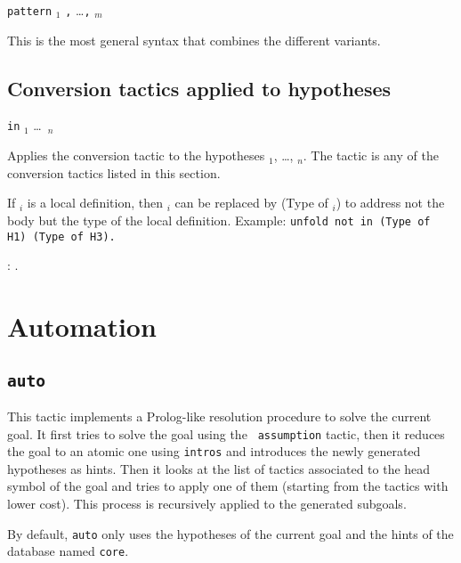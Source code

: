 \begin{coq_example*}
\begin{Variants}
\item {\tt pattern} {\term$_1$}  {\tt ,} \dots {\tt ,}
    {\term$_m$} 

  This is the most general syntax that combines the different variants.

\end{Variants}

\subsection{Conversion tactics applied to hypotheses}

{\convtactic} {\tt in} \ident$_1$ \dots\ \ident$_n$

Applies the conversion tactic {\convtactic} to the
hypotheses \ident$_1$, \ldots, \ident$_n$. The tactic {\convtactic} is
any of the conversion tactics listed in this section.

If \ident$_i$ is a local definition, then \ident$_i$ can be replaced
by (Type of \ident$_i$) to address not the body but the type of the
local definition. Example: {\tt unfold not in (Type of H1) (Type of H3).}

\begin{ErrMsgs}
\item {} : {\ident}.
\end{ErrMsgs}


\section{Automation}
\subsection{\tt auto}
\label{auto}

This tactic implements a Prolog-like resolution procedure to solve the
current goal. It first tries to solve the goal using the {\tt
  assumption} tactic, then it reduces the goal to an atomic one using
{\tt intros} and introduces the newly generated hypotheses as hints.
Then it looks at the list of tactics associated to the head symbol of
the goal and tries to apply one of them (starting from the tactics
with lower cost). This process is recursively applied to the generated
subgoals.

By default, \texttt{auto} only uses the hypotheses of the current goal and the
hints of the database named {\tt core}.


\end{coq_example*}
